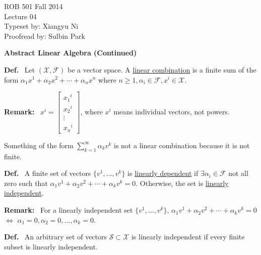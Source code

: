 \documentclass[letterpaper]{article}
\begin{document}
\baselineskip=48pt  %


\setlength{\parskip}{.3in}
\setlength{\itemsep}{.3in}

\pagestyle{plain}

{\Large \bf
\begin{center}
ROB 501 Fall 2014 \\
Lecture 04 \\
Typeset by: Xiangyu Ni \\
Proofread by: Sulbin Park \\
\end{center}
}

\Large

\begin{center}
\textbf{Abstract Linear Algebra (Continued)}
\end{center}

\noindent \textbf{Def.}~ Let $(\mathcal{X},\mathcal{F})$ be a vector space. A \underline{linear combination} is a finite sum of the form $\alpha_1x^1+\alpha_2x^2+\dotsb+\alpha_nx^n$ where $n\geq 1, \alpha_i\in\mathcal{F}, x^i\in\mathcal{X}$.

\noindent \textbf{Remark:}~ $x^i=\begin{bmatrix}
    {x_1}^i \\
    {x_2}^i \\
    \vdots \\
    {x_n}^i
    \end{bmatrix}$, where $x^i$ means individual vectors, not powers.

    Something of the form $\sum_{k=1}^{\infty} \alpha_kv^k$ is not a linear combination because it is not finite.

\noindent \textbf{Def.}~ A finite set of vectors $\{v^1, \dots, v^k\}$ is \underline{linearly dependent} if $\exists\alpha_i\in\mathcal{F}$ not all zero such that $\alpha_1v^1+\alpha_2v^2+\dotsb+\alpha_kv^k=0$. Otherwise, the set is \underline{linearly independent}.

\noindent \textbf{Remark:}~ For a linearly independent set $\{v^1, \dots, v^k\}$, $\alpha_1v^1+\alpha_2v^2+\dotsb+\alpha_kv^k=0$ $\iff$ $\alpha_1=0, \alpha_2=0, \dots, \alpha_k=0$.

\noindent \textbf{Def.}~ An arbitrary set of vectors $\mathcal{S}\subset\mathcal{X}$ is linearly independent if every finite subset is linearly independent.

\newpage
\end{document}
